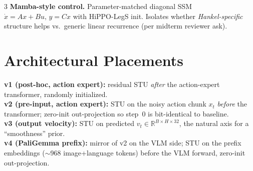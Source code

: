 \documentclass[landscape]{article}
\begin{document}
\begin{multicols}{3}
\textbf{Mamba-style control.} Parameter-matched diagonal SSM $\dot x = Ax + Bu,\, y = Cx$ with HiPPO-LegS init. Isolates whether \emph{Hankel-specific} structure helps vs.\ generic linear recurrence (per midterm reviewer ask).

\section*{Architectural Placements}

\textbf{v1 (post-hoc, action expert):} residual STU \emph{after} the action-expert transformer, randomly initialized.\\[-0.3em]
\textbf{v2 (pre-input, action expert):} STU on the noisy action chunk $x_t$ \emph{before} the transformer; zero-init out-projection so step~0 is bit-identical to baseline.\\[-0.3em]
\textbf{v3 (output velocity):} STU on predicted $v_t \in \mathbb{R}^{B \times H \times 32}$, the natural axis for a ``smoothness'' prior.\\[-0.3em]
\textbf{v4 (PaliGemma prefix):} mirror of v2 on the VLM side; STU on the prefix embeddings ($\sim$968 image+language tokens) before the VLM forward, zero-init out-projection.


\end{multicols}
\end{document}
